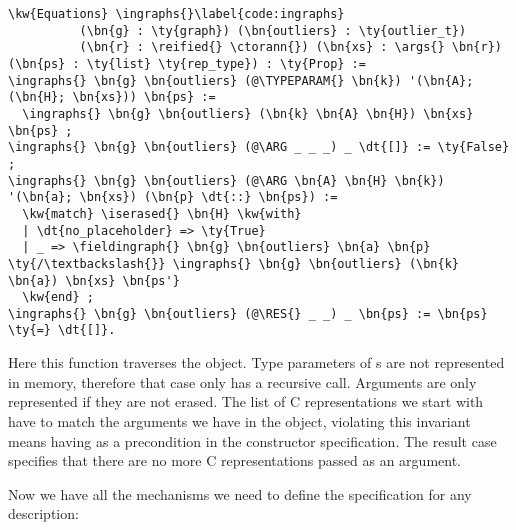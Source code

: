 \newcommand{\ingraphs}{\hyperref[code:ingraphs]{\fn{in\_\linebreak[0]graphs}}}
\begin{Verbatim}
\kw{Equations} \ingraphs{}\label{code:ingraphs}
          (\bn{g} : \ty{graph}) (\bn{outliers} : \ty{outlier_t})
          (\bn{r} : \reified{} \ctorann{}) (\bn{xs} : \args{} \bn{r}) (\bn{ps} : \ty{list} \ty{rep_type}) : \ty{Prop} :=
\ingraphs{} \bn{g} \bn{outliers} (@\TYPEPARAM{} \bn{k}) '(\bn{A}; (\bn{H}; \bn{xs})) \bn{ps} :=
  \ingraphs{} \bn{g} \bn{outliers} (\bn{k} \bn{A} \bn{H}) \bn{xs} \bn{ps} ;
\ingraphs{} \bn{g} \bn{outliers} (@\ARG _ _ _) _ \dt{[]} := \ty{False} ;
\ingraphs{} \bn{g} \bn{outliers} (@\ARG \bn{A} \bn{H} \bn{k}) '(\bn{a}; \bn{xs}) (\bn{p} \dt{::} \bn{ps}) := 
  \kw{match} \iserased{} \bn{H} \kw{with}
  | \dt{no_placeholder} => \ty{True}
  | _ => \fieldingraph{} \bn{g} \bn{outliers} \bn{a} \bn{p} \ty{/\textbackslash{}} \ingraphs{} \bn{g} \bn{outliers} (\bn{k} \bn{a}) \bn{xs} \bn{ps'} 
  \kw{end} ;
\ingraphs{} \bn{g} \bn{outliers} (@\RES{} _ _) _ \bn{ps} := \bn{ps} \ty{=} \dt{[]}.
\end{Verbatim}

Here this function traverses the \args{} object. Type parameters of \constructor{}s are not represented in memory, therefore that case only has a recursive call. Arguments are only represented if they are not erased. The list of C representations we start with have to match the arguments we have in the \args{} object, violating this invariant means having  as a precondition in the constructor specification. The result case specifies that there are no more C representations passed as an argument.

Now we have all the mechanisms we need to define the \constructor{} specification for any \constructor{} description:

